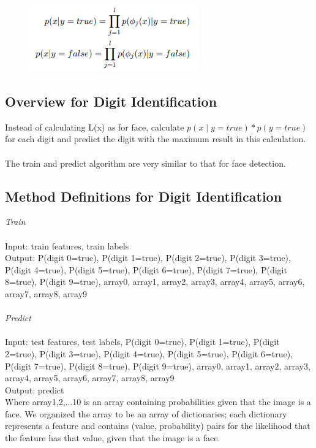 \documentclass{article}
\begin{document}
\begin{figure}[H]
  	\includegraphics[scale=.7]{Formulas.png}
\end{figure}


\subsection{Overview for Digit Identification}

Instead of calculating L(x) as for face, calculate $p(x\mid y = true)*p(y = true)$ for each digit and predict the digit with the maximum result in this calculation. \\\\
The train and predict algorithm are very similar to that for face detection.
\subsection{Method Definitions for Digit Identification}
\textit{Train}\\\\
Input: train features, train labels\\
Output: P(digit 0=true), P(digit 1=true), P(digit 2=true), P(digit 3=true), P(digit 4=true), P(digit 5=true), P(digit 6=true), P(digit 7=true), P(digit 8=true), P(digit 9=true),  array0, array1, array2, array3, array4, array5, array6, array7, array8, array9\\\\
\textit{Predict}\\\\
Input: test features, test labels, P(digit 0=true), P(digit 1=true), P(digit 2=true), P(digit 3=true), P(digit 4=true), P(digit 5=true), P(digit 6=true), P(digit 7=true), P(digit 8=true), P(digit 9=true),  array0, array1, array2, array3, array4, array5, array6, array7, array8, array9\\
Output: predict\\

Where array1,2,...10 is an array containing probabilities given that the image is a face. We organized the array to be an array of dictionaries; each dictionary represents a feature and contains (value, probability) pairs for the likelihood that the feature has that value, given that the image is a face. \\\\
\end{document}
